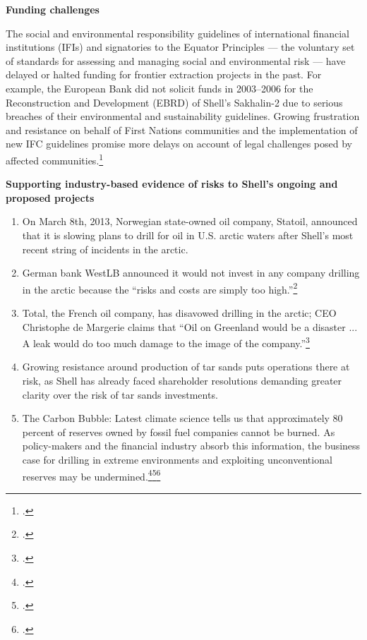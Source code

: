 \textbf{Funding challenges}



The social and environmental responsibility guidelines of international financial institutions (IFIs) and signatories to the Equator Principles --- the voluntary set of standards for assessing and managing social and environmental risk --- have delayed or halted funding for frontier extraction projects in the past. 
For example, the European Bank did not solicit funds in 2003--2006 for the Reconstruction and Development (EBRD) of Shell's Sakhalin-2 due to serious breaches of their environmental and sustainability guidelines. 
Growing frustration and resistance on behalf of First Nations communities and the implementation of new IFC guidelines promise more delays on account of legal challenges posed by affected communities.\footcite[][]{Mathiason_2005}



\textbf{Supporting industry-based evidence of risks to Shell's ongoing and proposed projects}



\begin{enumerate}
	\item On March 8th, 2013, Norwegian state-owned oil company, Statoil, announced that it is slowing plans to drill for oil in U.S. arctic waters after Shell's most recent string of incidents in the arctic.
	\item German bank WestLB announced it would not invest in any company drilling in the arctic because the ``risks and costs are simply too high.''\footcite[][]{Naidoo_2012}
	\item Total, the French oil company, has disavowed drilling in the arctic; CEO Christophe de Margerie claims that ``Oil on Greenland would be a disaster ... A leak would do too much damage to the image of the company.''\footcite[][]{NewsWire_2012}
	\item Growing resistance around production of tar sands puts operations there at risk, as Shell has already faced shareholder resolutions demanding greater clarity over the risk of tar sands investments.
	\item The Carbon Bubble: Latest climate science tells us that approximately 80 percent of reserves owned by fossil fuel companies cannot be burned. As policy-makers and the financial industry absorb this information, the business case for drilling in extreme environments and exploiting unconventional reserves may be undermined.\footcite[][]{carbontracker}\footcite[][]{UNEP_2009}\footcite[][]{HSBC_2013}
\end{enumerate}



